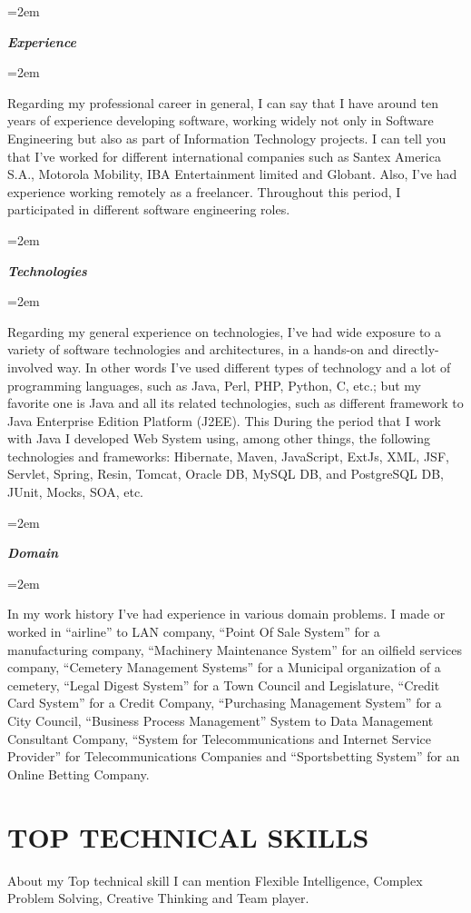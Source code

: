 \documentclass[paper=a4,fontsize=11pt]{scrartcl} %
\newlength{\spacebox}
\newcommand{\sepspace}{\vspace*{1em}}		%
\newcommand{\NewPart}[1]{\section*{\uppercase{#1}}}
\newcommand{\PersonalEntry}[2]{
		\noindent\hangindent=2em\hangafter=0 %
		\parbox{\spacebox}{        %
		\textit{#1}}		       %
		\hspace{1.5em} #2 \par}    %
\newcommand{\SkillsEntry}[2]{      %
		\noindent\hangindent=2em\hangafter=0 %
		\parbox{\spacebox}{        %
		\textit{#1}}			   %
		\hspace{1.5em} #2 \par}    %
\begin{document}
\sepspace

\SkillsEntry{\large{\textbf{Experience}}}{}
\SkillsEntry{}{
Regarding my professional career in general, I can say that I have around ten years of experience developing software, working widely not only in Software Engineering but also as part of Information Technology projects. I can tell you that I've worked for different international companies such as Santex America S.A., Motorola Mobility, IBA Entertainment limited and Globant. Also, I've had experience working remotely as a freelancer. Throughout this period, I participated in different software engineering roles. 
}

\sepspace

\SkillsEntry{\large{\textbf{Technologies}}}{}
\SkillsEntry{}{
Regarding my general experience on technologies, I've had wide exposure to a variety of software technologies and architectures, in a hands-on and directly-involved way. In other words I've used different types of technology and a lot of programming languages, such as Java, Perl, PHP, Python, C, etc.; but my favorite one is Java and all its related technologies, such as different framework to Java Enterprise Edition Platform (J2EE). This During the period that I work with Java I developed Web System using, among other things, the following technologies and frameworks: Hibernate, Maven, JavaScript, ExtJs, XML, JSF, Servlet, Spring, Resin, Tomcat, Oracle DB, MySQL DB, and PostgreSQL DB, JUnit, Mocks, SOA, etc.
}

\sepspace

\SkillsEntry{\large{\textbf{Domain}}}{}
\SkillsEntry{}{
	In my work history I've had experience in various domain problems. I made or worked in “airline” to LAN company, “Point Of Sale System” for a manufacturing company, “Machinery Maintenance System” for an oilfield services company, “Cemetery Management Systems” for a Municipal organization of a cemetery, “Legal Digest System” for a Town Council and Legislature, “Credit Card System” for a Credit Company, “Purchasing Management System” for a City Council,  “Business Process Management” System to Data Management Consultant Company, “System for Telecommunications and Internet Service Provider” for Telecommunications Companies and “Sportsbetting System” for an Online Betting Company.
}

\NewPart{Top Technical Skills}{
About my Top technical skill I can mention Flexible Intelligence, Complex Problem Solving, Creative Thinking and Team player.
}
\end{document}
